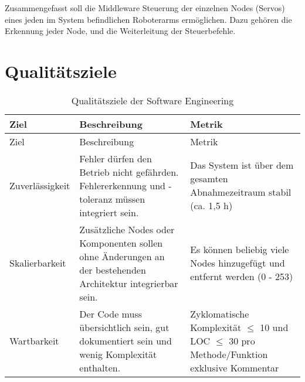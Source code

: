 Zusammengefasst soll die Middleware Steuerung der einzelnen Nodes (Servos) eines jeden im System befindlichen Roboterarms ermöglichen. Dazu gehören die Erkennung jeder Node, und die Weiterleitung der Steuerbefehle.

\newpage
\section{Qualitätsziele}
\begin{longtable}{|>{\raggedright\arraybackslash}p{4cm}|>{\raggedright\arraybackslash}p{5cm}|>{\raggedright\arraybackslash}p{5cm}|}
	\caption{Qualitätsziele der Software Engineering} \label{tab:seziele} \\
	\hline
	Ziel & Beschreibung & Metrik \\
	\hline
	\endfirsthead
	
	\hline
	Ziel & Beschreibung & Metrik \\
	\hline
	\endhead
	
	\hline
	\endfoot
	
	
	Zuverlässigkeit & 
	Fehler dürfen den Betrieb nicht gefährden. Fehlererkennung und -toleranz müssen integriert sein.
	& Das System ist über dem gesamten Abnahmezeitraum stabil (ca. 1,5 h)
	\\
	\hline
	Skalierbarkeit & 
	Zusätzliche Nodes oder Komponenten sollen ohne Änderungen an der bestehenden Architektur integrierbar sein. 
	& Es können beliebig viele Nodes hinzugefügt und entfernt werden (0 - 253)
	\\
	\hline
	Wartbarkeit & 
	Der Code muss übersichtlich sein, gut dokumentiert sein und wenig Komplexität enthalten. 
	& Zyklomatische Komplexität $\leq$ 10 und LOC $\leq$ 30 pro Methode/Funktion exklusive Kommentar  
	
	\\
	\hline
	

\end{longtable}
